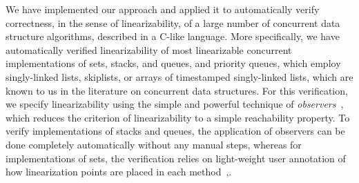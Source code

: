 We have implemented our approach and applied it to automatically verify
correctness, in the sense of linearizability, of a large number of
concurrent data structure algorithms, described in a C-like language.
More specifically, we have automatically verified linearizability of 
most linearizable concurrent implementations
of sets, stacks, and queues, and priority queues,
which employ singly-linked lists, skiplists, or
arrays of timestamped singly-linked lists, which are known to us in
the literature on concurrent data structures.
For this verification, we specify linearizability
using the simple and powerful technique of
{\em observers}~\cite{AHHR:integrated:short,BEEH:icalp15,HSV:concur13},
which reduces the criterion of linearizability to a simple reachability
property. To verify implementations of stacks and queues, 
the application of observers can be done completely automatically without
any manual steps, whereas for implementations of sets, the verification relies
on light-weight user annotation of how linearization points are placed in
each method~\cite{Quy:sas16},.

